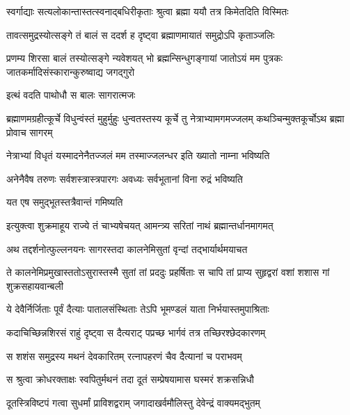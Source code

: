 \twolineshloka
{स्वर्गाद्याः सत्यलोकान्तास्तत्स्वनाद्बधिरीकृताः}
{श्रुत्वा ब्रह्मा ययौ तत्र किमेतदिति विस्मितः} %

\twolineshloka
{तावत्समुद्रस्योत्सङ्गे तं बालं स ददर्श ह}
{दृष्ट्वा ब्रह्माणमायातं समुद्रोऽपि कृताञ्जलिः} %

\threelineshloka
{प्रणम्य शिरसा बालं तस्योत्सङ्गे न्यवेशयत्}
{भो ब्रह्मन्सिन्धुगङ्गायां जातोऽयं मम पुत्रकः}
{जातकर्मादिसंस्कारान्कुरुष्वाद्य जगद्गुरो} %



\onelineshloka
{इत्थं वदति पाथोधौ स बालः सागरात्मजः} %

\threelineshloka
{ब्रह्माणमग्रहीत्कूर्चे विधुन्वंस्तं मुहुर्मुहुः}
{धुन्वतस्तस्य कूर्चे तु नेत्राभ्यामगमज्जलम्}
{कथञ्चिन्मुक्तकूर्चोऽथ ब्रह्मा प्रोवाच सागरम्} %


\twolineshloka
{नेत्राभ्यां विधृतं यस्मादनेनैतज्जलं मम}
{तस्माज्जलन्धर इति ख्यातो नाम्ना भविष्यति} %

\twolineshloka
{अनेनैवैष तरुणः सर्वशस्त्रास्त्रपारगः}
{अवध्यः सर्वभूतानां विना रुद्रं भविष्यति} %


\onelineshloka
{यत एष समुद्भूतस्तत्रैवान्तं गमिष्यति} %


\twolineshloka
{इत्युक्त्वा शुक्रमाहूय राज्ये तं चाभ्यषेचयत्}
{आमन्त्र्य सरितां नाथं ब्रह्मान्तर्धानमागमत्} %

\twolineshloka
{अथ तद्दर्शनोत्फुल्लनयनः सागरस्तदा}
{कालनेमिसुतां वृन्दां तद्भार्यार्थमयाचत} %

\twolineshloka
{ते कालनेमिप्रमुखास्ततोऽसुरास्तस्मै सुतां तां प्रददुः प्रहर्षिताः}
{स चापि तां प्राप्य सुहृद्वरां वशां शशास गां शुक्रसहायवान्बली} %





\twolineshloka
{ये देवैर्निर्जिताः पूर्वं दैत्याः पातालसंस्थिताः}
{तेऽपि भूमण्डलं याता निर्भयास्तमुपाश्रिताः} %

\twolineshloka
{कदाचिच्छिन्नशिरसं राहुं दृष्ट्वा स दैत्यराट्}
{पप्रच्छ भार्गवं तत्र तच्छिरश्छेदकारणम्} %

\twolineshloka
{स शशंस समुद्रस्य मथनं देवकारितम्}
{रत्नापहरणं चैव दैत्यानां च पराभवम्} %

\twolineshloka
{स श्रुत्वा क्रोधरक्ताक्षः स्वपितुर्मथनं तदा}
{दूतं सम्प्रेषयामास घस्मरं शक्रसन्निधौ} %

\twolineshloka
{दूतस्त्रिविष्टपं गत्वा सुधर्मां प्राविशद्वराम्}
{जगादाखर्वमौलिस्तु देवेन्द्रं वाक्यमद्भुतम्} %


